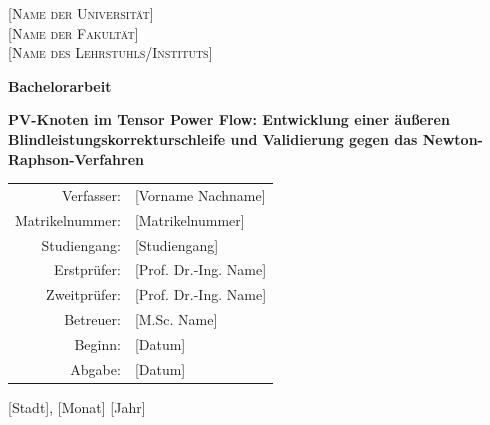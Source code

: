 \begin{titlepage}
	\centering
	
	
	\vspace{1cm}
	
	{\large\textsc{[Name der Universität]}}\\[0.3cm]
	{\large\textsc{[Name der Fakultät]}}\\[0.3cm]
	{\large\textsc{[Name des Lehrstuhls/Instituts]}}\\
	
	\vspace{2cm}
	
	{\Large\textbf{Bachelorarbeit}}\\
	
	\vspace{1.5cm}
	
	{\LARGE\textbf{PV-Knoten im Tensor Power Flow: Entwicklung einer äußeren Blindleistungskorrekturschleife und Validierung gegen das Newton-Raphson-Verfahren}}\\
	
	\vspace{2cm}
	
	{\large
		\begin{tabular}{rl}
			Verfasser:       & [Vorname Nachname] \\
			Matrikelnummer:  & [Matrikelnummer] \\
			Studiengang:     & [Studiengang] \\[0.5cm]
			Erstprüfer:      & [Prof. Dr.-Ing. Name] \\
			Zweitprüfer:     & [Prof. Dr.-Ing. Name] \\
			Betreuer:        & [M.Sc. Name] \\[0.5cm]
			Beginn:          & [Datum] \\
			Abgabe:          & [Datum] \\
		\end{tabular}
	}
	
	\vfill
	
	{\large [Stadt], [Monat] [Jahr]}
	
\end{titlepage}

\cleardoublepage